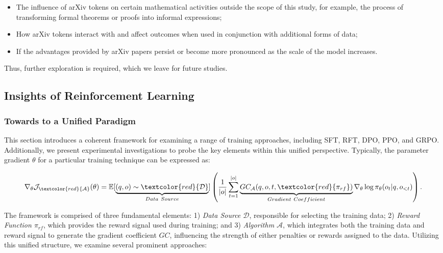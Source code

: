 \begin{itemize}[topsep=0pt]
\begin{itemize}[topsep=0pt]
\begin{itemize}[topsep=0pt]
    \item The influence of arXiv tokens on certain mathematical activities outside the scope of this study, for example, the process of transforming formal theorems or proofs into informal expressions;
    \item How arXiv tokens interact with and affect outcomes when used in conjunction with additional forms of data;
    \item If the advantages provided by arXiv papers persist or become more pronounced as the scale of the model increases.
\end{itemize}

Thus, further exploration is required, which we leave for future studies.

\subsection{Insights of Reinforcement Learning}
\subsubsection{Towards to a Unified Paradigm} This section introduces a coherent framework for examining a range of training approaches, including SFT, RFT, DPO, PPO, and GRPO. Additionally, we present experimental investigations to probe the key elements within this unified perspective. Typically, the parameter gradient $\theta$ for a particular training technique can be expressed as:

\begin{equation}
    \nabla_{\theta}\mathcal{J}_{\textcolor{red}{\mathcal{A}}}(\theta) = \mathbb{E}[\underbrace{(q,o) \sim \textcolor{red}{\mathcal{D}}}_{Data \ Source}]\left( \frac{1}{|o|} \sum_{t=1}^{|o|}  \underbrace{GC_{{\mathcal{A}}}(q, o, t, \textcolor{red}{\pi_{{rf}}})}_{Gradient \ Coefficient}  \nabla_{\theta}\log \pi_{\theta}(o_t | q, o_{<t})\right).
\label{eq:objective}
\end{equation}

The framework is comprised of three fundamental elements: 1) \textit{Data Source $\mathcal{D}$}, responsible for selecting the training data; 2) \textit{Reward Function $\pi_{{rf}}$}, which provides the reward signal used during training; and 3) \textit{Algorithm $\mathcal{A}$}, which integrates both the training data and reward signal to generate the gradient coefficient $GC$, influencing the strength of either penalties or rewards assigned to the data. Utilizing this unified structure, we examine several prominent approaches:


\end{itemize}
\end{itemize}
